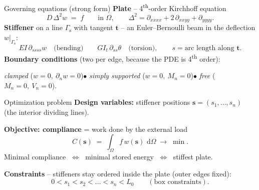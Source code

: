 \documentclass[10pt,c,intlimits,aspectratio=1610]{beamer}
\newcommand{\Om}{\Omega}
\newcommand{\dd}{\,\mathrm{d}}
\newcommand{\Gs}{\Gamma_{\mathrm s}}
\newcommand{\highlight}[1]{{\color{dpRed}#1}}
\begin{document}
\begin{frame}{Governing equations (strong form)}
  \textbf{Plate} -- 4\textsuperscript{th}-order Kirchhoff equation
  \begin{equation*}
     D\,\Delta^2 w \;=\; f \qquad \text{in } \Om,
     \qquad \Delta^2 = \partial_{xxxx}+2\,\partial_{xxyy}+\partial_{yyyy}.
  \end{equation*}
  \textbf{Stiffener} on a line $\Gs$ with tangent $\boldsymbol t$ -- an
  Euler--Bernoulli beam in the deflection $w|_{\Gs}$:
  \begin{equation*}
     EI\,\partial_{ssss}w \quad\text{(bending)} \qquad
     GI_t\,\partial_{ss}\theta \quad\text{(torsion)},\qquad
     s = \text{arc length along } \boldsymbol t .
  \end{equation*}
  \vspace{1mm}
  \textbf{Boundary conditions} (two per edge, because the PDE is
  4\textsuperscript{th} order):
  \begin{center}
  \emph{clamped} \;($w=0,\ \partial_n w =0$)\quad$\bullet$\quad
  \emph{simply supported} \;($w=0,\ M_n=0$)\quad$\bullet$\quad
  \emph{free} \;($M_n=0,\ V_n=0$).
  \end{center}
\end{frame}

\begin{frame}{Optimization problem}
  \textbf{Design variables:} stiffener positions
  $\boldsymbol s = (s_1,\dots,s_{n})$ (the interior dividing lines).

  \medskip
  \textbf{Objective: compliance} = work done by the external load
  \begin{equation*}
     C(\boldsymbol s) \;=\; \int_\Om f\, w(\boldsymbol s)\,\dd\Om
     \;\longrightarrow\; \min .
  \end{equation*}
  Minimal compliance $\;\Leftrightarrow\;$ minimal stored energy
  $\;\Leftrightarrow\;$ \highlight{stiffest plate}.

  \medskip
  \textbf{Constraints} -- stiffeners stay ordered inside the plate
  (outer edges fixed):
  \begin{equation*}
     0 < s_1 < s_2 < \dots < s_n < L_0
     \qquad(\text{box constraints}).
  \end{equation*}
\end{frame}

\end{document}
